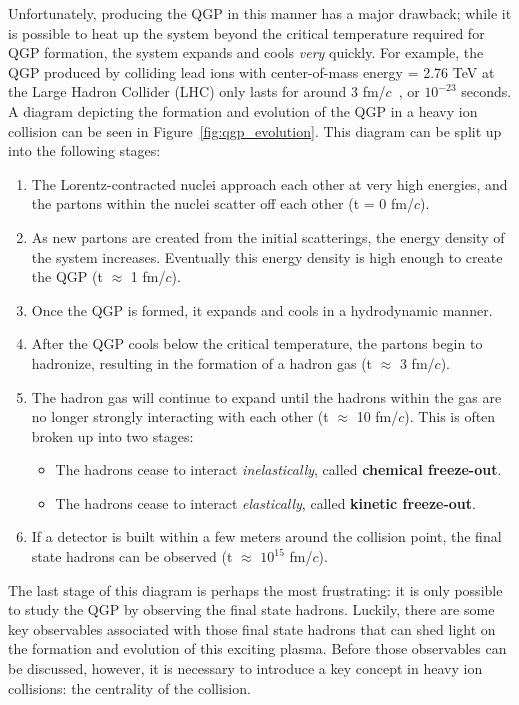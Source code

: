 Unfortunately, producing the QGP in this manner has a major drawback; while it is possible to heat up the system beyond the critical temperature required for QGP formation, the system expands and cools \textit{very} quickly. For example, the QGP produced by colliding lead ions with center-of-mass energy \snn = 2.76 TeV at the Large Hadron Collider (LHC) only lasts for around 3 fm/$c$~\cite{QGPFormation}, or $10^{-23}$ seconds. A diagram depicting the formation and evolution of the QGP in a heavy ion collision can be seen in Figure~\ref{fig:qgp_evolution}. This diagram can be split up into the following stages:
%
\begin{enumerate}
    \item The Lorentz-contracted nuclei approach each other at very high energies, and the partons within the nuclei scatter off each other (t = 0 fm/$c$).
    \item As new partons are created from the initial scatterings, the energy density of the system increases. Eventually this energy density is high enough to create the QGP (t $\approx$ 1 fm/$c$).
    \item Once the QGP is formed, it expands and cools in a hydrodynamic manner. 
    \item After the QGP cools below the critical temperature, the partons begin to hadronize, resulting in the formation of a hadron gas (t $\approx$ 3 fm/$c$).
    \item The hadron gas will continue to expand until the hadrons within the gas are no longer strongly interacting with each other (t $\approx$ 10 fm/$c$). This is often broken up into two stages:
        \begin{itemize}
            \item The hadrons cease to interact \textit{inelastically}, called \textbf{chemical freeze-out}. 
            \item The hadrons cease to interact \textit{elastically}, called \textbf{kinetic freeze-out}.
        \end{itemize} 
    \item If a detector is built within a few meters around the collision point, the final state hadrons can be observed (t $\approx$ $10^{15}$ fm/$c$).
\end{enumerate} 
%
The last stage of this diagram is perhaps the most frustrating: it is only possible to study the QGP by observing the final state hadrons. Luckily, there are some key observables associated with those final state hadrons that can shed light on the formation and evolution of this exciting plasma. Before those observables can be discussed, however, it is necessary to introduce a key concept in heavy ion collisions: the centrality of the collision.


